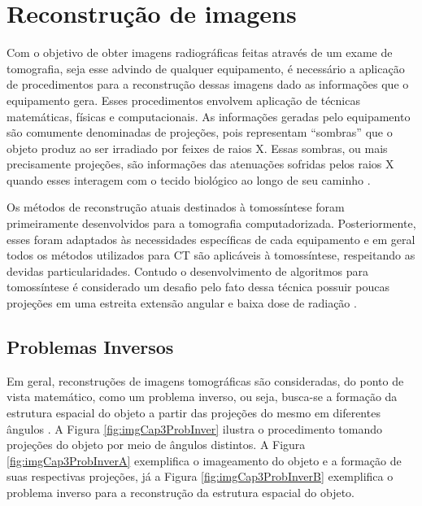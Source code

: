 \chapter[Reconstrução]{Reconstrução de imagens}\label{Capitulo3}


Com o objetivo de obter imagens radiográficas feitas através de um exame de tomografia, seja esse advindo de qualquer equipamento, é necessário a aplicação de procedimentos para a reconstrução dessas imagens dado as informações que o equipamento gera. Esses procedimentos envolvem aplicação de técnicas matemáticas, físicas e computacionais. As informações geradas pelo equipamento são comumente denominadas de projeções, pois representam ``sombras'' que o objeto produz ao ser irradiado por feixes de raios X. Essas sombras, ou mais precisamente projeções, são informações das atenuações sofridas pelos raios X quando esses interagem com o tecido biológico ao longo de seu caminho \cite{buzug2008computed,avinash1988principles}.
 
Os métodos de reconstrução atuais destinados à tomossíntese foram primeiramente desenvolvidos para a tomografia computadorizada. Posteriormente, esses foram adaptados às necessidades específicas de cada equipamento e em geral todos os métodos utilizados para \acs{CT} são aplicáveis à tomossíntese, respeitando as devidas particularidades. Contudo o desenvolvimento de algoritmos para tomossíntese é considerado um desafio pelo fato dessa técnica possuir poucas projeções em uma estreita extensão angular e baixa dose de radiação \cite{levakhina2014three,yang2012numerical}.   

\section{Problemas Inversos}

Em geral, reconstruções de imagens tomográficas são consideradas, do ponto de vista matemático, como um problema inverso, ou seja, busca-se a formação da estrutura espacial do objeto a partir das projeções do mesmo em diferentes ângulos \cite{buzug2008computed}. A Figura \ref{fig:imgCap3ProbInver} ilustra o procedimento tomando projeções do objeto por meio de ângulos distintos. A Figura \ref{fig:imgCap3ProbInverA} exemplifica o imageamento do objeto e a formação de suas respectivas projeções, já a Figura \ref{fig:imgCap3ProbInverB} exemplifica o problema inverso para a reconstrução da estrutura espacial do objeto. 

